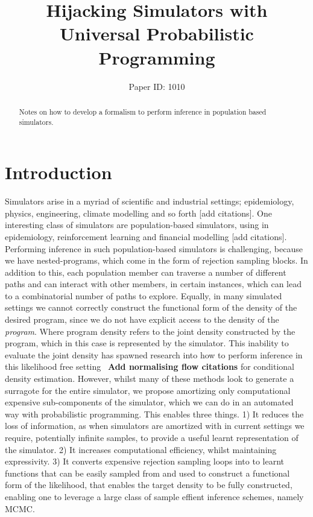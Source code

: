 \documentclass{article}
\title{Hijacking Simulators with Universal Probabilistic Programming}
\author{%
Paper ID: 1010 }
\begin{document}

\maketitle

\begin{abstract}

    Notes on how to develop a formalism to perform inference in population based simulators.
\end{abstract}

\section{Introduction}
\label{sec:intro}
Simulators arise in a myriad of scientific and industrial settings; epidemiology, physics, engineering, climate modelling and so forth [add citations].
One interesting class of simulators are population-based simulators, using in epidemiology, reinforcement learning
and financial modelling [add citations].
Performing inference in such population-based simulators is challenging, because we have nested-programs, 
which come in the form of rejection sampling blocks. 
In addition to this, each population member can traverse a number of different paths and 
can interact with other members, in certain instances, which can lead to a combinatorial number of paths 
to explore. 
Equally, in many simulated settings we cannot correctly construct the functional form of the density of the desired program,
since we do not have explicit access to the density of the \emph{program}.
Where program density refers to the joint density constructed by the program, which in this case is represented by the simulator.
This inability to evaluate the joint density has spawned research into how to perform 
inference in this likelihood free setting~\cite{greenberg2019automatic} \textbf{Add normalising flow citations}
for conditional density estimation. However, whilst many of these methods look to generate a surragote 
for the entire simulator, we propose amortizing only computational expensive sub-components 
of the simulator, which we can do in an automated way with probabilistic programming. 
This enables three things. 
1) It reduces the loss of information, as when simulators are amortized with in current
settings we require, potentially infinite samples, to provide a useful learnt representation of the simulator. 
2) It increases computational efficiency, whilst maintaining expressivity. 
3) It converts expensive rejection sampling loops into to learnt functions that can be 
easily sampled from and used to construct a functional form of the likelihood, that enables the 
target density to be fully constructed, enabling one to leverage a large class of sample effient inference schemes, namely MCMC.
\end{document}

